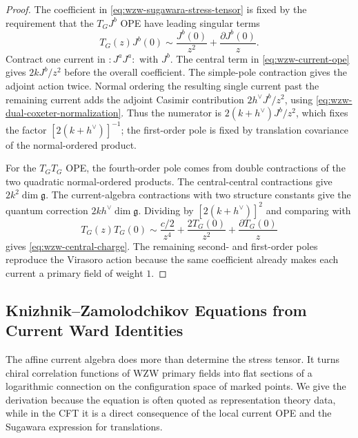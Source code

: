 \begin{proof}
The coefficient in \eqref{eq:wzw-sugawara-stress-tensor} is fixed by the
requirement that the \(T_GJ^b\) OPE have leading singular terms
\[
  T_G(z)J^b(0)
  \sim
  \frac{J^b(0)}{z^2}+\frac{\partial J^b(0)}{z}.
\]
Contract one current in \(:J^aJ^a:\) with \(J^b\).  The central term in
\eqref{eq:wzw-current-ope} gives \(2kJ^b/z^2\) before the overall
coefficient.  The simple-pole contraction gives the adjoint action twice.
Normal ordering the resulting single current past the remaining current
adds the adjoint Casimir contribution \(2h^\vee J^b/z^2\), using
\eqref{eq:wzw-dual-coxeter-normalization}.  Thus the numerator is
\(2(k+h^\vee)J^b/z^2\), which fixes the factor
\([2(k+h^\vee)]^{-1}\); the first-order pole is fixed by translation
covariance of the normal-ordered product.

For the \(T_GT_G\) OPE, the fourth-order pole comes from double contractions
of the two quadratic normal-ordered products.  The central-central
contractions give \(2k^2\dim\mathfrak g\).  The current-algebra
contractions with two structure constants give the quantum correction
\(2kh^\vee\dim\mathfrak g\).  Dividing by
\([2(k+h^\vee)]^2\) and comparing with
\[
  T_G(z)T_G(0)
  \sim
  \frac{c/2}{z^4}+\frac{2T_G(0)}{z^2}+\frac{\partial T_G(0)}{z}
\]
gives \eqref{eq:wzw-central-charge}.  The remaining second- and first-order
poles reproduce the Virasoro action because the same coefficient already
makes each current a primary field of weight \(1\).
\end{proof}

\subsection{Knizhnik--Zamolodchikov Equations from Current Ward Identities}
\label{subsec:wzw-kz-equations}

The affine current algebra does more than determine the stress tensor.  It
turns chiral correlation functions of WZW primary fields into flat sections of
a logarithmic connection on the configuration space of marked points.  We give
the derivation because the equation is often quoted as representation theory
data, while in the CFT it is a direct consequence of the local current OPE and
the Sugawara expression for translations.

